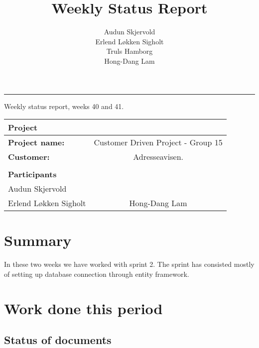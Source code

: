 \documentclass[12pt, a4paper]{article}
\title{Weekly Status Report}
\author{Audun Skjervold \\ Erlend Løkken Sigholt \\ Truls Hamborg \\ Hong-Dang Lam}
\begin{document}
\maketitle
\newpage

 
\newpage
\hrule
\newpage

\begin{center}
Weekly status report, weeks 40 and 41.
  \begin{tabular}{| l  c |}
    \hline
    Project & \\ \hline
    \textbf{Project name:} & Customer Driven Project - Group 15 \\
    \textbf{Customer:} & Adresseavisen. \\ \hline
     & \\
     \textbf{Participants} & \\ \hline
     Audun Skjervold &   \\
     Erlend Løkken Sigholt & Hong-Dang Lam \\
    \hline
  \end{tabular}
  \end{center}




\section{Summary}
In these two weeks we have worked with sprint 2. The sprint has consisted mostly of setting up database connection through entity framework.
\section{Work done this period}
\subsection{Status of documents}
\end{document}
